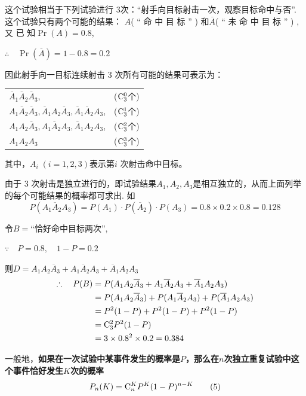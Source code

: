 \begin{solution}
这个试验相当于下列试验进行 3次：“射手向目标射击一次，观察目标命中与否”. 这个试验只有两个可能的结果： $A$( “ 命 中 目 标 ” ) 和$\overline {A}$( “ 未 命 中 目 标 ” ) , 又 已 知$\Pr( A) = 0. 8$,

$\therefore\quad \Pr(\overline{A})=1-0.8=0.2$

因此射手向一目标连续射击 3 次所有可能的结果可表示为：
\begin{center}
\begin{tabular}{p{}c}
    $\overline{A}_1\overline{A}_2\overline{A}_3$, & (${\rm C}_3^0$个)\\
   $A_{1} \overline{A}_{2} \overline{A}_{3}, \overline{A}_{1}A_{2} \overline{A}_{3}, \overline{A}_{1} \overline{A}_{2}A_{3}$,  & (${\rm C}_3^1$个)\\
   $A_{1}A_{2} \overline{A}_{3},A_{1} \overline{A}_{2}A_{3}, \overline{A}_{1} {A}_{2}A_{3}$,
& (${\rm C}_3^2$个)\\
$A_1A_2A_3$ & (${\rm C}_3^3$个)
\end{tabular}
\end{center}
其中，$A_i\; (i=1,2,3)$表示第$i$ 次射击命中目标。

由于 3 次射击是独立进行的，即试验结果$A_1,A_2,A_3$是相互独立的，从而上面列举的每个可能结果的概率都可求出. 如
$$P(A_{1}\overline{A}_{2}A_{3})=P(A_{1})\cdot P( \overline{A}_{2})\cdot P(A_{3})=0.8\times0.2\times0.8=0.128$$

令$B=$“恰好命中目标两次”,

$\because\quad  P=0.8,\quad 1-P=0.2$

则$D=A_{1}A_{2}\overline{A}_{3}+A_{1}\overline{A}_{2}A_{3}+\overline{A}_{1}A_{2}A_{3}$
\[\begin{split}
    \therefore\quad P(B)&=P(A_{1}A_{2} \overline{A}_{3}+A_{1} \overline{A}_{2}A_{3}+ \overline{A}_{1}A_{2}A_{3})\\
    &=P(A_{1}A_{2} \overline{A}_{3})+P(A_{1} \overline{A}_{2}A_{3})+P( \overline{A}_{1}A_{2}A_{3})\\
    &=P^{2}(1-P)+P^{2}(1-P)+P^{2}(1-P)\\
    &={\rm C}_{3}^{2}P^{2}(1-P)\\
    &=3\times0.8^{2}\times0.2=0.384
\end{split}\]
\end{solution}

一般地，\textbf{如果在一次试验中某事件发生的概率是$P$，那么在$n$次独立重复试验中这个事件恰好发生$K$次的概率}
\begin{equation}
    P_n(K)={\rm C}^K_n P^K (1-P)^{n-K}\tag{5}
\end{equation}

